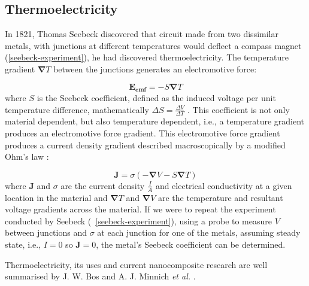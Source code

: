 \documentclass[12pt,draft]{article}
\newcommand{\figref}[2][\figurename~]{#1\ref{#2}}
\renewcommand{\vec}[1]{\mathbf{#1}}
\begin{document}
\subsection{Thermoelectricity}
In 1821, Thomas Seebeck discovered that circuit made from two dissimilar metals, with junctions at different temperatures would deflect a compass magnet (\ref{seebeck-experiment}), he had discovered thermoelectricity. The temperature gradient $\vec{\nabla} T$ between the junctions generates an electromotive force:

\begin{equation}
\label{seebeck-emf}
	\vec{E_{emf}} = -S \vec{\nabla} T
\end{equation}
where $S$ is the Seebeck coefficient, defined as the induced voltage per unit temperature difference, mathematically $\Delta S = \frac{\Delta V}{\Delta T}$ \cite{auparay}. This coefficient is not only material dependent, but also temperature dependent, i.e., a temperature gradient produces an electromotive force gradient. This electromotive force gradient produces a current density gradient described macroscopically by a modified Ohm's law \cite{ziman}:

\begin{equation}
\label{current-density}
	\vec{J} = \sigma (-\vec{\nabla} V - S \vec{\nabla} T)
\end{equation}
where $\vec{J}$ and $\sigma$ are the current density $\frac{I}{A}$ and electrical conductivity at a given location in the material and $\vec{\nabla} T$ and $\vec{\nabla} V$ are the temperature and resultant voltage gradients across the material. If we were to repeat the experiment conducted by Seebeck (\figref{seebeck-experiment}), using a probe to measure $V$ between junctions and $\sigma$ at each junction for one of the metals, assuming steady state, i.e., $I=0$ so $\vec{J} = 0$, the metal's Seebeck coefficient can be determined.

Thermoelectricity, its uses and current nanocomposite research are well summarised by J. W. Bos \cite{bos-review} and A. J. Minnich \emph{et al.} \cite{minnich-review}.
\end{document}
